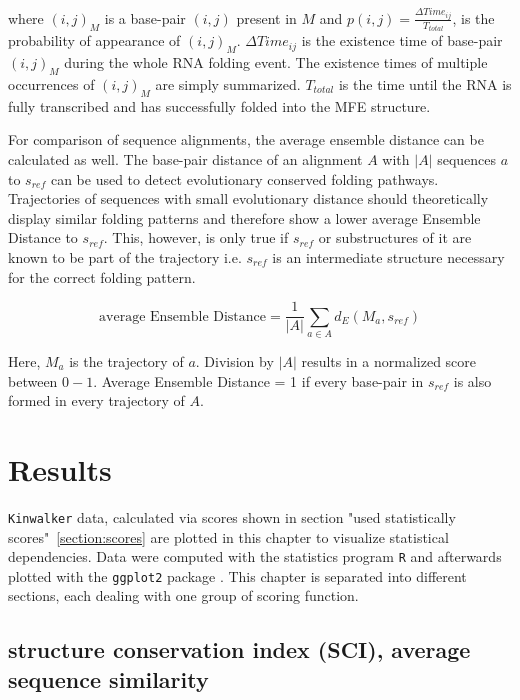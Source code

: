 \documentclass[ twoside,openright,titlepage,numbers=noenddot,headinclude,%
                footinclude=false, cleardoublepage=empty,abstractoff, %
                BCOR=5mm,paper=a4,fontsize=11pt,%
                ngerman,american,%
                ]{scrreprt}
\begin{document}
where $(i,j)_{M}$ is a base-pair $(i,j)$ present in $M$ and $p(i,j) =
\frac{\Delta Time_{ij}}{T_{total}}$, is the probability of appearance of
$(i,j)_{M}$. $\Delta Time_{ij}$ is the existence time of base-pair $(i,j)_{M}$ during the whole RNA folding event. The existence times of multiple occurrences of $(i,j)_{M}$ are simply summarized. $T_{total}$ is the time until the RNA is fully transcribed and has successfully folded into the MFE structure.


For comparison of sequence alignments, the average ensemble distance can be
calculated as well. The base-pair distance of an alignment $A$ with $|A|$
sequences $a$ to $s_{ref}$ can be used to detect evolutionary conserved
folding pathways. Trajectories of sequences with small evolutionary
distance should theoretically display similar folding patterns and
therefore show a lower average Ensemble Distance to $s_{ref}$. This,
however, is only true if $s_{ref}$ or substructures of it are known to be part of the
trajectory
i.e. $s_{ref}$ is an intermediate structure necessary for the
correct folding pattern.

\begin{equation}
\mbox{average Ensemble Distance} = \frac{1}{|A|} \sum\limits_{a\in A} d_E(M_a,s_{ref})
\label{eq:meanEnsembleDistance}	
\end{equation}

Here, $M_a$ is the trajectory of $a$. Division by $|A|$ results in a
normalized score between $0-1$.
Average Ensemble Distance = 1 if every base-pair in $s_{ref}$ is also
formed in every trajectory of $A$.



\chapter{Results}




\texttt{Kinwalker} data, calculated via scores shown in section "used
statistically scores"~\ref{section:scores} are plotted in this chapter to
visualize statistical dependencies. Data were computed with the statistics
program \texttt{R}\cite{R} and afterwards plotted with the \texttt{ggplot2} package
\cite{ggplot2}. This chapter is separated into different sections, each
dealing with one group of scoring function.
	
\section{structure conservation index (SCI), average sequence similarity}
\end{document}
